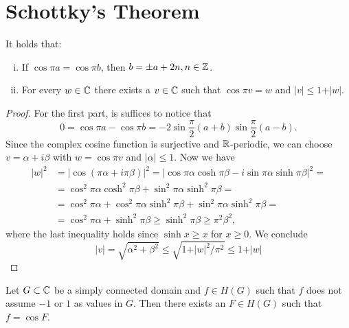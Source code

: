 \section{Schottky's Theorem}
\label{sec:schottkys-theorem}

\begin{lemma} \label{lem:schottky-1}
    It holds that:
    \begin{enumerate}[i.]
        \item If $\cos \pi a = \cos \pi b$, then $b = \pm a + 2n, n \in \mathbb{Z}$.
        \item For every $w \in \mathbb{C}$ there exists a $v \in \mathbb{C}$ such that $\cos \pi v = w$ and $\vert v \vert \leq 1 + \vert w \vert$.
    \end{enumerate}
\end{lemma}

\begin{proof}
    For the first part, is suffices to notice that
    $$ 0 = \cos \pi a - \cos \pi b = \textstyle -2 \sin \frac{\pi}{2} ( a + b ) \sin \frac{\pi}{2} ( a - b ). $$
    Since the complex cosine function is surjective and $\mathbb{R}$-periodic, we can choose $v = \alpha + i \beta$ with $w = \cos \pi v$ and $\vert \alpha \vert \leq 1$. Now we have
    \begin{align*}
        \vert w \vert^2 &= \vert \cos (\pi \alpha + i \pi \beta) \vert^2 = \vert \cos \pi \alpha \cosh \pi \beta - i \sin \pi \alpha \sinh \pi \beta \vert^2 = \\
        &= \cos^2 \pi \alpha \cosh^2 \pi \beta + \sin^2 \pi \alpha \sinh^2 \pi \beta = \\
        &= \cos^2 \pi \alpha + \cos^2 \pi \alpha \sinh^2 \pi \beta + \sin^2 \pi \alpha \sinh^2 \pi \beta = \\
        &= \cos^2 \pi \alpha + \sinh^2 \pi \beta \geq \sinh^2 \pi \beta \geq \pi^2 \beta^2,
    \end{align*}
    where the last inequality holds since $\sinh x \geq x$ for $x \geq 0$. We conclude
    \begin{equation*}
        \vert v \vert = \sqrt{\alpha^2 + \beta^2} \leq \sqrt{1 + \vert w \vert^2 / \pi^2} \leq 1 + \vert w \vert
    \end{equation*}
\end{proof}

\begin{lemma} \label{lem:schottky-2}
    Let $G \subset \mathbb{C}$ be a simply connected domain and $f \in H(G)$ such that $f$ does not assume $-1$ or $1$ as values in $G$. Then there exists an $F \in H(G)$ such that $f = \cos F$.
\end{lemma}

